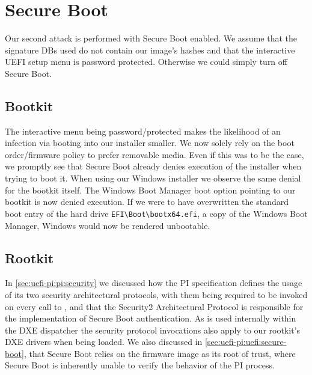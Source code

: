 
\section{Secure Boot}
\label{sec:attacks:secure-boot}

Our second attack is performed with Secure Boot enabled.
We assume that the signature \acp{DB} used do not contain our image's hashes and that the interactive \ac{UEFI} setup menu is password protected.
Otherwise we could simply turn off Secure Boot.

\subsection{Bootkit}

The interactive menu being password\-/protected makes the likelihood of an infection via booting into our installer smaller.
We now solely rely on the boot order/firmware policy to prefer removable media.
Even if this was to be the case, we promptly see that Secure Boot already denies execution of the installer when trying to boot it.
When using our Windows installer we observe the same denial for the bootkit itself.
The Windows Boot Manager boot option pointing to our bootkit is now denied execution.
If we were to have overwritten the standard boot entry of the hard drive \lstinline{EFI\Boot\bootx64.efi}, a copy of the Windows Boot Manager, Windows would now be rendered unbootable.

\subsection{Rootkit}

In \autoref{sec:uefi-pi:pi:security} we discussed how the \ac{PI} specification defines the usage of its two security architectural protocols, with them being required to be invoked on every call to , and that the Security2 Architectural Protocol is responsible for the implementation of Secure Boot authentication.
As  is used internally within the \ac{DXE} dispatcher the security protocol invocations also apply to our rootkit's \ac{DXE} drivers when being loaded.
We also discussed in \autoref{sec:uefi-pi:uefi:secure-boot}, that Secure Boot relies on the firmware image as its root of trust, where Secure Boot is inherently unable to verify the behavior of the \ac{PI} process.

